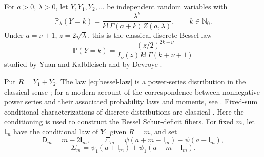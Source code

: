 \documentclass[11pt,a4paper]{amsart}
\numberwithin{equation}{section}
\theoremstyle{plain}
\theoremstyle{definition}
\newcommand{\N}{\mathbb N}
\newcommand{\Dfin}{\mathsf D}
\begin{document}
For \(a>0\), \(\lambda>0\), let \(Y,Y_1,Y_2,\ldots\) be independent random
variables with
\begin{equation}\label{eq:bessel-law}
 \mathbb P_\lambda(Y=k)
 =\frac{\lambda^k}{k!\,\Gamma(a+k)Z(a,\lambda)},
 \qquad k\in\N_0.
\end{equation}
Under \(a=\nu+1\), \(z=2\sqrt\lambda\), this is the classical discrete Bessel
law
\[
 \mathbb P(Y=k)
 =\frac{(z/2)^{2k+\nu}}
 {I_\nu(z)\,k!\,\Gamma(k+\nu+1)}
\]
studied by Yuan and Kalbfleisch and by Devroye
\cite{YuanKalbfleisch2000Bessel,Devroye2002Bessel}.

Put \(R=Y_1+Y_2\).  The law \eqref{eq:bessel-law} is a power-series
distribution in the classical sense \cite{Patil1962PowerSeries}; for a modern
account of the correspondence between nonnegative power series and their
associated probability laws and moments, see
\cite{Canton2026PowerSeries}.  Fixed-sum conditional characterizations of
discrete distributions are classical \cite{PatilSeshadri1964Characterization}.
Here the conditioning is used to construct the Bessel Schur-deficit fibers.
For fixed \(m\), let
\(\mathsf I_m\) have the conditional law of \(Y_1\) given \(R=m\), and set
\[
 \Dfin_m=m-2\mathsf I_m,
 \qquad
 \Xi_m=\psi(a+m-\mathsf I_m)-\psi(a+\mathsf I_m),
\]
\[
 \Sigma_m
 =\psi_1(a+\mathsf I_m)+\psi_1(a+m-\mathsf I_m).
\]
\end{document}
